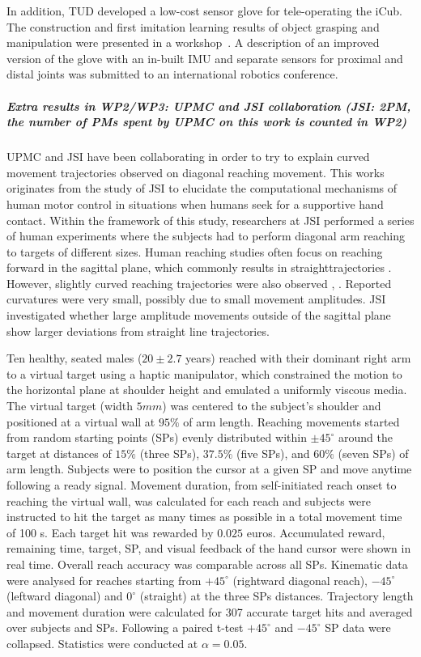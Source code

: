In addition, TUD developed a low-cost sensor glove for tele-operating the iCub. The construction and first imitation learning results of object grasping and manipulation were presented in a workshop~\cite{RueckertICRAWS2015}. A description of an improved version of the glove with an in-built IMU and separate sensors for proximal and distal joints was submitted to an international robotics conference. 

\subparagraph*{Extra results in WP2/WP3: UPMC and JSI collaboration (JSI: 2PM, the number of PMs spent by UPMC on this work is counted in WP2)}

UPMC and JSI have been collaborating in order to try to explain curved movement trajectories observed on diagonal reaching movement. This works originates from the study of JSI to elucidate the computational mechanisms of human motor control in situations when humans seek for a supportive hand contact. Within the framework of this study, researchers at JSI performed a series of human experiments where the subjects had to perform diagonal arm reaching to targets of different sizes. Human reaching studies often focus on reaching forward in the sagittal plane, which commonly results in straighttrajectories \cite{ThoroughmanNature2000}. However, slightly curved reaching trajectories were also observed \cite{IzawaJNeuro2008}, \cite{UnoBioCyber1989}. Reported curvatures were very small, possibly due to small movement amplitudes. JSI investigated whether large amplitude movements outside of the sagittal plane show larger deviations from straight line trajectories.

Ten healthy, seated males ($20 \pm 2.7$ years) reached with their dominant right arm to a virtual target using a haptic manipulator, which constrained the motion to the horizontal plane at shoulder height and emulated a uniformly viscous media. The virtual target (width $5mm$) was centered to the subject’s shoulder and positioned at a virtual wall at $95\%$ of arm length. Reaching movements started from random starting points (SPs) evenly distributed within $\pm 45^{\circ}$ around the target at distances of $15\%$ (three SPs), $37.5\%$ (five SPs), and $60\%$ (seven SPs) of arm length. Subjects were to position the cursor at a given SP and move anytime following a ready signal. Movement duration, from self-initiated reach onset to reaching the virtual wall, was calculated for each reach and subjects were instructed to hit the target as many times as possible in a total movement time of 100 s. Each target hit was rewarded by $0.025$ euros. Accumulated reward, remaining time, target, SP, and visual feedback of the hand cursor were shown in real time. Overall reach accuracy was comparable across all SPs.
Kinematic data were analysed for reaches starting from $+45^{\circ}$ (rightward diagonal reach), $-45^{\circ}$ (leftward diagonal) and $0^{\circ}$ (straight) at the three SPs distances. Trajectory length and movement duration were calculated for 307 accurate target hits and averaged over subjects and SPs. Following a paired t-test $+45^{\circ}$ and $-45^{\circ}$ SP data were collapsed. Statistics were conducted at $\alpha = 0.05$.

